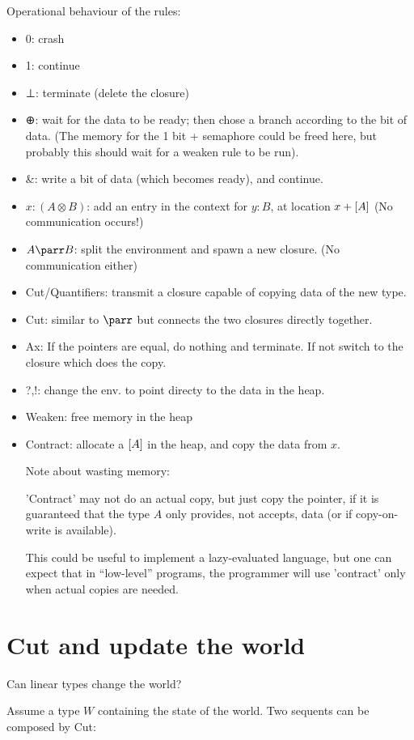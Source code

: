 \documentclass[english]{lipics-stripped}
\begin{document}
Operational behaviour of the rules:
\begin{itemize}
\item 0: crash
\item 1: continue
\item ⊥: terminate (delete the closure)
\item ⊕: wait for the data to be ready; then chose a branch according
  to the bit of data. (The memory for the 1 bit + semaphore could be
  freed here, but probably this should wait for a weaken rule to be
  run).
\item \&: write a bit of data (which becomes ready), and continue.
\item $x:(A ⊗ B)$: add an entry in the context for $y:B$, at location
  $x+[A]$ (No communication occurs!)
\item $A \pa B$: split the environment and spawn a new closure. (No communication either)
\item Cut/Quantifiers: transmit a closure capable of copying data of
  the new type.
\item Cut: similar to $\pa$ but connects the two closures directly together.
\item Ax: If the pointers are equal, do nothing and terminate. If not
  switch to the closure which does the copy.
\item ?,!: change the env. to point directy to the data in the heap.
\item Weaken: free memory in the heap
\item Contract: allocate a $[A]$ in the heap, and copy the data
  from $x$.  

  Note about wasting memory: 

  'Contract' may not do an actual copy, but just copy the pointer, if
  it is guaranteed that the type $A$ only provides, not accepts, data
  (or if copy-on-write is available). 

  This could be useful to implement a lazy-evaluated language, but one
  can expect that in ``low-level'' programs, the programmer will use
  'contract' only when actual copies are needed.
\end{itemize}


\section{Cut and update the world}
Can linear types change the world?

Assume a type $W$ containing the state of the world. Two sequents can
be composed by Cut:
\end{document}

